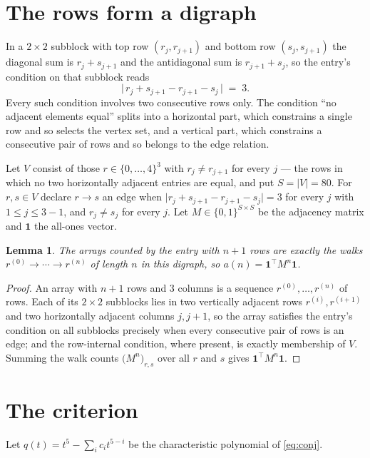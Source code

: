 \documentclass[11pt,a4paper]{article}
\theoremstyle{plain}
\newtheorem{lemma}[theorem]{Lemma}
\theoremstyle{definition}
\begin{document}
\section{The rows form a digraph}

In a $2\times2$ subblock with top row $(r_j,r_{j+1})$ and bottom row $(s_j,s_{j+1})$ the
diagonal sum is $r_j+s_{j+1}$ and the antidiagonal sum is $r_{j+1}+s_j$, so the entry's
condition on that subblock reads
\[
\bigl|\,r_j+s_{j+1}-r_{j+1}-s_j\,\bigr|\;=\;3.
\]
Every such condition involves two consecutive rows only. The condition ``no adjacent elements equal'' splits into a horizontal
part, which constrains a single row and so selects the vertex set, and a vertical part,
which constrains a consecutive pair of rows and so belongs to the edge relation.

Let $V$ consist of those $r\in\{0,\dots,4\}^{3}$ with $r_j\ne r_{j+1}$ for every
$j$ --- the rows in which no two horizontally adjacent entries are equal, and put $S=|V|=80$. For $r,s\in V$ declare $r\to s$ an edge
when $\bigl|r_j+s_{j+1}-r_{j+1}-s_j\bigr|=3$ for every $j$ with
$1\le j\le3-1$, and $r_j\ne s_j$ for every $j$. Let $M\in\{0,1\}^{S\times S}$ be the adjacency matrix and $\mathbf{1}$
the all-ones vector.

\begin{lemma}\label{lem:walk}
The arrays counted by the entry with $n+1$ rows are exactly the walks
$r^{(0)}\to\cdots\to r^{(n)}$ of length $n$ in this digraph, so
$a(n)=\mathbf{1}^{\!\top}M^{n}\mathbf{1}$.
\end{lemma}

\begin{proof}
An array with $n+1$ rows and $3$ columns is a sequence $r^{(0)},\dots,r^{(n)}$ of
rows. Each of its $2\times2$ subblocks lies in two vertically adjacent rows
$r^{(i)},r^{(i+1)}$ and two horizontally adjacent columns $j,j+1$, so the array satisfies
the entry's condition on all subblocks precisely when every consecutive pair of rows is an
edge; and the row-internal condition, where present, is exactly membership of $V$. Summing
the walk counts $\bigl(M^{n}\bigr)_{r,s}$ over all $r$ and $s$ gives
$\mathbf{1}^{\!\top}M^{n}\mathbf{1}$.
\end{proof}

\section{The criterion}

Let $q(t)=t^{5}-\sum_i c_i t^{5-i}$ be the characteristic polynomial of
\eqref{eq:conj}.
\end{document}
